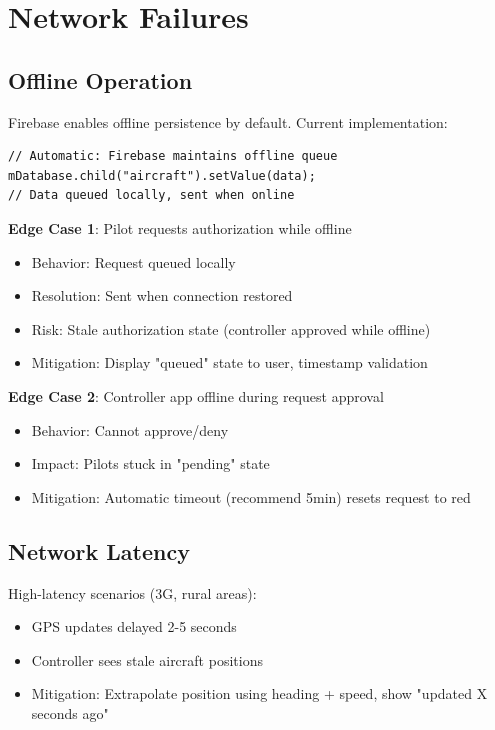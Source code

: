 \documentclass[11pt,a4paper]{report}
\begin{document}
\section{Network Failures}

\subsection{Offline Operation}

Firebase enables offline persistence by default. Current implementation:

\begin{lstlisting}
// Automatic: Firebase maintains offline queue
mDatabase.child("aircraft").setValue(data);
// Data queued locally, sent when online
\end{lstlisting}

\textbf{Edge Case 1}: Pilot requests authorization while offline

\begin{itemize}
    \item Behavior: Request queued locally
    \item Resolution: Sent when connection restored
    \item Risk: Stale authorization state (controller approved while offline)
    \item Mitigation: Display "queued" state to user, timestamp validation
\end{itemize}

\textbf{Edge Case 2}: Controller app offline during request approval

\begin{itemize}
    \item Behavior: Cannot approve/deny
    \item Impact: Pilots stuck in "pending" state
    \item Mitigation: Automatic timeout (recommend 5min) resets request to red
\end{itemize}

\subsection{Network Latency}

High-latency scenarios (3G, rural areas):

\begin{itemize}
    \item GPS updates delayed 2-5 seconds
    \item Controller sees stale aircraft positions
    \item Mitigation: Extrapolate position using heading + speed, show "updated X seconds ago"
\end{itemize}
\end{document}
